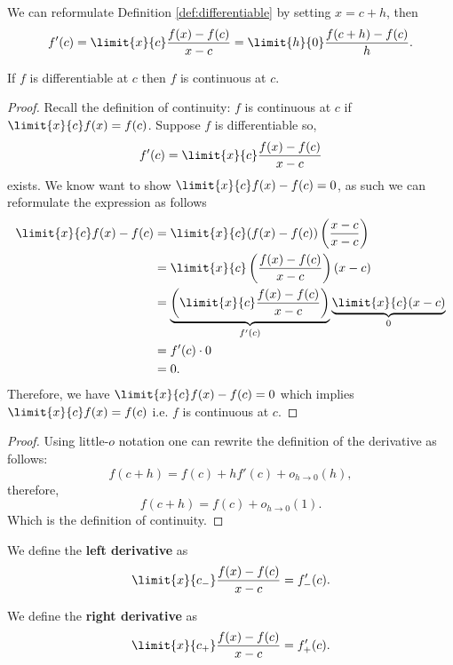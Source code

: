 \documentclass[12pt, a4paper]{article}
\begin{document}
\begin{mdnote}
    We can reformulate Definition \ref{def:differentiable} by setting \(x=c+h\), then 
    \[f'(c)=\limit{x}{c} \frac{f(x)-f(c)}{x-c} = \limit{h}{0} \frac{f(c+h)-f(c)}{h}.\]
\end{mdnote}

\begin{mdthm}
    If \(f\) is differentiable at \(c\) then \(f\) is continuous at \(c\).
\end{mdthm}

\begin{proof}
    Recall the definition of continuity: \(f\) is continuous at \(c\) if \(\limit{x}{c} f(x) =f(c)\). Suppose \(f\) is differentiable so,
    \[f'(c) = \limit{x}{c} \frac{f(x)-f(c)}{x-c}\]
    exists. We know want to show \(\limit{x}{c} f(x) -f(c)=0\), as such we can reformulate the expression as follows
    \[\begin{aligned}
        \limit{x}{c} f(x) -f(c) &= \limit{x}{c} (f(x) -f(c)) \left( \frac{x-c}{x-c} \right) \\
        &= \limit{x}{c}\left( \frac{f(x)-f(c)}{x-c} \right) (x-c) \\
        &= \underbrace{\left( \limit{x}{c}\frac{f(x)-f(c)}{x-c} \right)}_{f'(c)}\underbrace{\limit{x}{c}(x-c)}_{0} \\
        &= f'(c) \cdot 0 \\
        &= 0.
    \end{aligned}\]
    Therefore, we have \(\limit{x}{c} f(x) -f(c)=0\) which implies \(\limit{x}{c} f(x) =f(c)\) i.e. \(f\) is continuous at \(c\).
\end{proof}

\begin{proof}
    Using little-\(o\) notation one can rewrite the definition of the derivative as follows:
    \[f(c+h)=f(c)+hf'(c)+o_{h\to 0 }(h),\]
    therefore,
    \[f(c+h)=f(c)+o_{h\to 0}(1).\]
    Which is the definition of continuity.
\end{proof}

\begin{definition}
    We define the \textbf{left derivative} as 
    \[\limit{x}{c_-} \frac{f(x)-f(c)}{x-c}=f'_-(c).\]
\end{definition}

\begin{definition}
    We define the \textbf{right derivative} as 
    \[\limit{x}{c_+} \frac{f(x)-f(c)}{x-c}=f'_+(c).\]
\end{definition}
\end{document}
